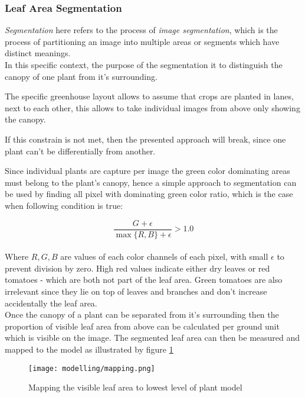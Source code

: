 \subsubsection{Leaf Area Segmentation}\label{subsec:segmentation}


\textit{Segmentation} here refers to the process of \textit{image segmentation}, which is the process
of partitioning an image into multiple areas or segments which have distinct meanings.\\

In this specific context, the purpose of the segmentation it to distinguish the canopy of one plant
from it's surrounding.

The specific greenhouse layout allows to assume that crops are planted in lanes, next to each other, this
allows to take individual images from above only showing the canopy.

If this constrain is not met, then the presented approach will break, since one plant can't be
differentially from another.

Since individual plants are capture per image the green color dominating areas must belong to the
plant's canopy, hence a simple approach to segmentation can be used by finding all pixel with
dominating green color ratio, which is the case when following condition is true:

\[
    \frac{G + \epsilon}{\max{\{R, B\}} + \epsilon} > 1.0 
\]\\

Where $R, G, B$ are values of each color channels of each pixel, with small $\epsilon$ to prevent division by zero.
High red values indicate either dry leaves or red tomatoes - which are both not part of the leaf
area.
Green tomatoes are also irrelevant since they lie on top of leaves and branches and don't increase
accidentally the leaf area.\\

Once the canopy of a plant can be separated from it's surrounding then the proportion of visible leaf
area from above can be calculated per ground unit which is visible on the image.
The segmented leaf area can then be measured and mapped to the model as illustrated
by figure \ref{fig:mapping}

\begin{figure}[H]
    \texttt{[image: modelling/mapping.png]}
    \caption{Mapping the visible leaf area to lowest level of plant model}
    \label{fig:mapping}
\end{figure}

